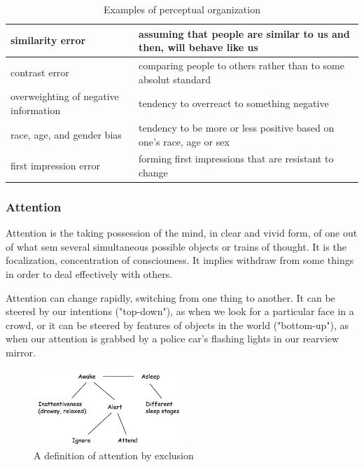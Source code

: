 \documentclass[12pt,article,oneside,a4paper]{memoir}
\begin{document}
\begin{table}
  \begin{tabular}{ p{5cm} |  p{10cm} }
    \hline
    similarity error & assuming that people are similar to us and then, will behave like us \\ \hline
    contrast error & comparing people to others rather than to some absolut standard \\ \hline
    overweighting of negative information & tendency to overreact to something negative \\ \hline
    race, age, and gender bias & tendency to be more or less positive based on one's race, age or sex \\ \hline
	first impression error & forming first impressions that are resistant to change \\ 
    \hline
  \end{tabular}
  \caption{Examples of perceptual organization}
  \label{table:accuracy-judgment}
\end{table}

\subsubsection{Attention}
Attention is the taking possession of the mind, in clear and vivid form, of one out of what sem several simultaneous possible objects or trains of thought. It is the focalization, concentration of consciouness. It implies withdraw from some things in order to deal effectively with others.

Attention can change rapidly, switching from one thing to another. It can be steered by our intentions ("top-down"), as when we look for a particular face in a crowd, or it
can be steered by features of objects in the world ("bottom-up"), as when our attention is grabbed by a police car's flashing lights in our rearview mirror.

\begin{figure}[h]
  \centering
  \includegraphics[width=0.5\textwidth]{imgs/attention.png}
  \caption{A definition of attention by exclusion}
  \label{fig:attention}
\end{figure}
\end{document}
